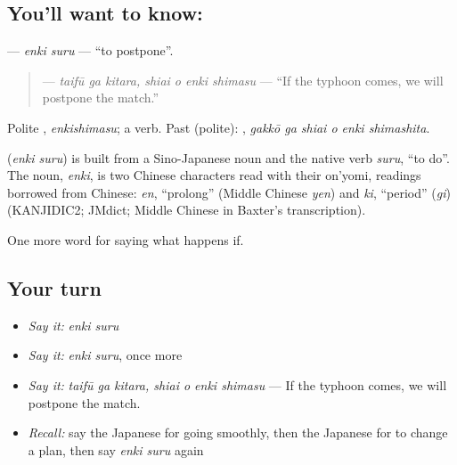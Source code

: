 \subsection*{You'll want to know: }
\textbf{} — \emph{enki suru} — \textquotedblleft{}to postpone\textquotedblright{}.

\begin{quote}
\textbf{  } — \emph{taifū ga kitara, shiai o enki shimasu} — \textquotedblleft{}If the typhoon comes, we will postpone the match.\textquotedblright{}
\end{quote}

Polite \textbf{}, \emph{enkishimasu}; a  verb. Past (polite): \textbf{  }, \emph{gakkō ga shiai o enki shimashita}.

\begin{cousinweb}
\textbf{} (\emph{enki suru}) is built from a Sino-Japanese noun and the native verb \emph{suru}, \textquotedblleft{}to do\textquotedblright{}. The noun, \emph{enki}, is two Chinese characters read with their on'yomi, readings borrowed from Chinese: \emph{en}, \textquotedblleft{}prolong\textquotedblright{} (Middle Chinese \emph{yen}) and \emph{ki}, \textquotedblleft{}period\textquotedblright{} (\emph{gi}) (KANJIDIC2; JMdict; Middle Chinese in Baxter's transcription).
\end{cousinweb}

\begin{grammarlens}[title={What you've built}]
One more word for saying what happens if.
\end{grammarlens}

\subsection*{Your turn}
\begin{itemize}
\raggedright
  \item \emph{Say it:} \emph{enki suru}
  \item \emph{Say it:} \emph{enki suru}, once more
  \item \emph{Say it:} \emph{taifū ga kitara, shiai o enki shimasu} — If the typhoon comes, we will postpone the match.
  \item \emph{Recall:} say the Japanese for going smoothly, then the Japanese for to change a plan, then say \emph{enki suru} again
\end{itemize}

